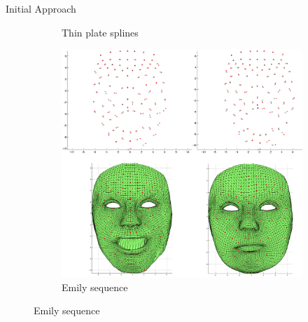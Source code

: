 \documentclass{beamer}
\begin{document}
\begin{frame}{Initial Approach}
{\begin{figure}
\begin{subfigure}[b]{0.2\textwidth}
                \caption{\hspace{0.2cm} Thin plate splines}
        \end{subfigure}
        \begin{subfigure}[b]{0.3\textwidth}
                \includegraphics[width=\textwidth]{img/Emilydomain}
                \caption{Emily sequence}
        \end{subfigure}
\end{figure}}


\end{frame}
\end{document}
